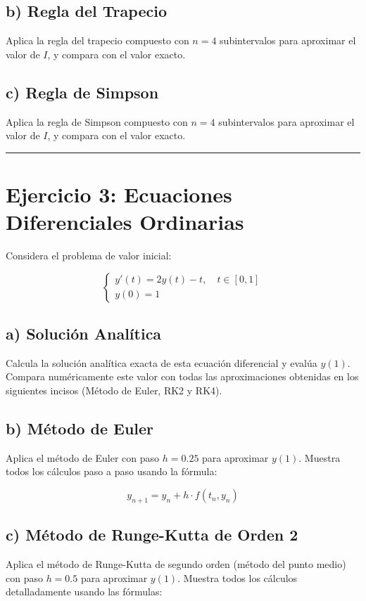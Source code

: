 \documentclass[12pt,a4paper]{article}
\begin{document}
\subsection*{b) Regla del Trapecio}
Aplica la regla del trapecio compuesto con $n = 4$ subintervalos para aproximar el valor de $I$, y compara con el valor exacto.

\subsection*{c) Regla de Simpson}
Aplica la regla de Simpson compuesto con $n = 4$ subintervalos para aproximar el valor de $I$, y compara con el valor exacto.

\vspace{0.5cm}
\hrule
\vspace{0.5cm}

\section*{Ejercicio 3: Ecuaciones Diferenciales Ordinarias}

Considera el problema de valor inicial:

$$\begin{cases}
y'(t) = 2y(t) - t, \quad t \in [0, 1] \\
y(0) = 1
\end{cases}$$

\subsection*{a) Solución Analítica}
Calcula la solución analítica exacta de esta ecuación diferencial y evalúa $y(1)$. Compara numéricamente este valor con todas las aproximaciones obtenidas en los siguientes incisos (Método de Euler, RK2 y RK4).

\subsection*{b) Método de Euler}
Aplica el método de Euler con paso $h = 0.25$ para aproximar $y(1)$. Muestra todos los cálculos paso a paso usando la fórmula:

$$y_{n+1} = y_n + h \cdot f(t_n, y_n)$$

\subsection*{c) Método de Runge-Kutta de Orden 2}
Aplica el método de Runge-Kutta de segundo orden (método del punto medio) con paso $h = 0.5$ para aproximar $y(1)$. Muestra todos los cálculos detalladamente usando las fórmulas:
\end{document}
